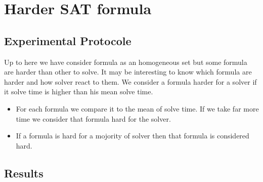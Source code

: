 \documentclass{article}
\begin{document}
\section{Harder SAT formula}
\subsection{Experimental Protocole}
Up to here we have consider formula as an homogeneous set but some formula are harder than other to solve. It may be interesting to know which formula are harder and how solver react to them. We consider a formula harder for a solver if it solve time is higher than his mean solve time.
\begin{itemize}
\item For each formula we compare it to the mean of solve time. If we take far more time we consider that formula hard for the solver.
\item If a formula is hard for a mojority of solver then that formula is considered hard. 
\end{itemize}
\subsection{Results}

\end{document}
